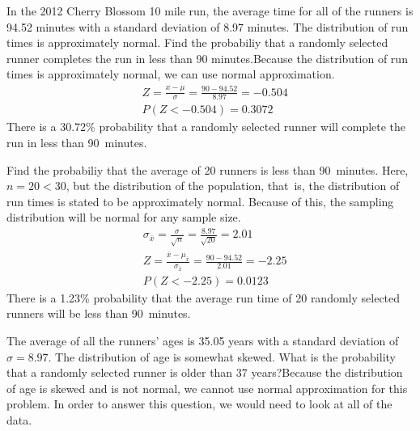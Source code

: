 \begin{examplewrap}
\begin{nexample}{
In the 2012 Cherry Blossom 10 mile run, the average time for all of the runners is 94.52 minutes with a standard deviation of 8.97 minutes. The distribution of run times is approximately normal. Find the probabiliy that a randomly selected runner completes the run in less than 90 minutes.}Because the distribution of run times is approximately normal, we can use normal approximation.
\begin{align*}
&Z = \frac{x - \mu}{\sigma}=\frac{90-94.52}{8.97}=-0.504 \\
&P(Z < -0.504) = 0.3072
\end{align*}
There is a 30.72\% probability that a randomly selected runner will complete the run in less than 90~minutes.
\end{nexample}
\end{examplewrap}

\begin{examplewrap}
\begin{nexample}{
Find the probabiliy that the average of 20 runners is less than 90~minutes.}
Here, $n=20<30$, but the distribution of the population, that~is, the distribution of run times is stated to be approximately normal. Because of this, the sampling distribution will be normal for any sample size.
\begin{align*}
&\sigma_{\bar{x}}=\frac{\sigma}{\sqrt{n}}=\frac{8.97}{\sqrt{20}}=2.01 \\
&Z = \frac{\bar{x} - \mu_{\bar{x}}}{\sigma_{\bar{x}}}=\frac{90-94.52}{2.01}=-2.25\\
&P(Z < -2.25) = 0.0123
\end{align*}
There is a 1.23\% probability that the average run time of 20 randomly selected runners will be less than 90~minutes.
\end{nexample}
\end{examplewrap}

\begin{examplewrap}
\begin{nexample}{
The average of all the runners' ages is 35.05 years with a standard deviation of $\sigma = 8.97$. The distribution of age is somewhat skewed. What is the probability that a randomly selected runner is older than 37 years?}Because the distribution of age is skewed and is not normal, we cannot use normal approximation for this problem. In order to answer this question, we would need to look at all of the data.
\end{nexample}
\end{examplewrap}

